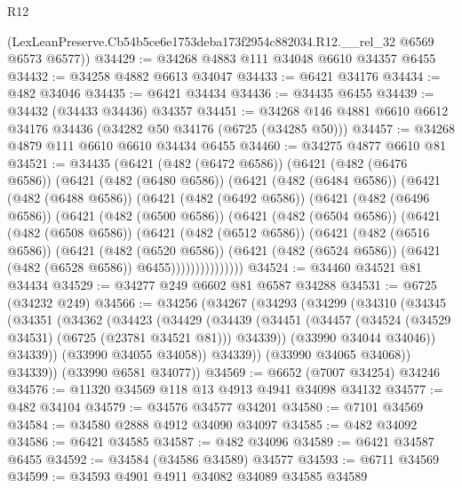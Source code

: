 \begin{lexlean}{R12}
\begin{coremodule}
      (LexLeanPreserve.Cb54b5ce6e1753deba173f2954c882034.R12.__rel_32 @6569 @6573 @6577))
@34429 := @34268 @4883 @111 @34048 @6610 @34357 @6455
@34432 := @34258 @4882 @6613 @34047
@34433 := @6421 @34176
@34434 := @482 @34046
@34435 := @6421 @34434
@34436 := @34435 @6455
@34439 := @34432 (@34433 @34436) @34357
@34451 := @34268 @146 @4881 @6610 @6612 @34176 @34436 (@34282 @50 @34176 (@6725 (@34285 @50)))
@34457 := @34268 @4879 @111 @6610 @6610 @34434 @6455
@34460 := @34275 @4877 @6610 @81
@34521 := @34435
    (@6421
      (@482 (@6472 @6586))
      (@6421
        (@482 (@6476 @6586))
        (@6421
          (@482 (@6480 @6586))
          (@6421
            (@482 (@6484 @6586))
            (@6421
              (@482 (@6488 @6586))
              (@6421
                (@482 (@6492 @6586))
                (@6421
                  (@482 (@6496 @6586))
                  (@6421
                    (@482 (@6500 @6586))
                    (@6421
                      (@482 (@6504 @6586))
                      (@6421
                        (@482 (@6508 @6586))
                        (@6421
                          (@482 (@6512 @6586))
                          (@6421
                            (@482 (@6516 @6586))
                            (@6421
                              (@482 (@6520 @6586))
                              (@6421
                                (@482 (@6524 @6586))
                                (@6421 (@482 (@6528 @6586)) @6455)))))))))))))))
@34524 := @34460 @34521 @81 @34434
@34529 := @34277 @249 @6602 @81 @6587 @34288
@34531 := @6725 (@34232 @249)
@34566 := @34256
    (@34267
      (@34293
        (@34299
          (@34310
            (@34345
              (@34351
                (@34362
                  (@34423
                    (@34429
                      (@34439
                        (@34451
                          (@34457 (@34524 (@34529 @34531) (@6725 (@23781 @34521 @81))) @34339))
                        (@33990 @34044 @34046))
                      @34339))
                  (@33990 @34055 @34058))
                @34339))
            (@33990 @34065 @34068))
          @34339))
      (@33990 @6581 @34077))
@34569 := @6652 (@7007 @34254) @34246
@34576 := @11320 @34569 @118 @13 @4913 @4941 @34098 @34132
@34577 := @482 @34104
@34579 := @34576 @34577 @34201
@34580 := @7101 @34569
@34584 := @34580 @2888 @4912 @34090 @34097
@34585 := @482 @34092
@34586 := @6421 @34585
@34587 := @482 @34096
@34589 := @6421 @34587 @6455
@34592 := @34584 (@34586 @34589) @34577
@34593 := @6711 @34569
@34599 := @34593 @4901 @4911 @34082 @34089 @34585 @34589

\end{coremodule}
\end{lexlean}
